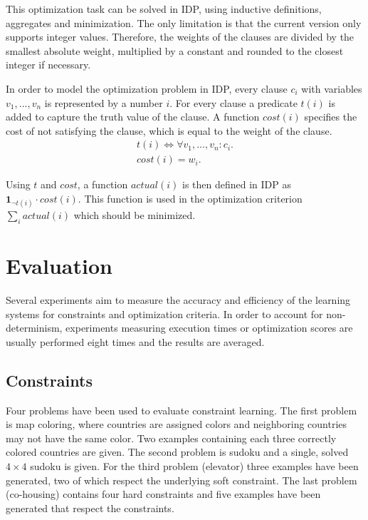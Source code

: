 \documentclass[letterpaper]{article}
\theoremstyle{definition}
\begin{document}
This optimization task can be solved in IDP, using inductive definitions, aggregates and minimization.
The only limitation is that the current version only supports integer values.
Therefore, the weights of the clauses are divided by the smallest absolute weight, multiplied by a constant and rounded to the closest integer if necessary.

In order to model the optimization problem in IDP, every clause $c_i$ with variables $v_1, ..., v_n$ is represented by a number $i$. For every clause a predicate $t(i)$ is added to capture the truth value of the clause.
A function $\mathit{cost}(i)$ specifies the cost of not satisfying the clause, which is equal to the weight of the clause.
\begin{eqnarray*}
  t(i) \Leftrightarrow \forall v_1, ..., v_n : c_i. \\
  cost(i) = w_i.
\end{eqnarray*}

Using $t$ and $\mathit{cost}$, a function $\mathit{actual}(i)$ is then defined in IDP as $\mathbf{1}_{\lnot t(i)} \cdot \mathit{cost}(i)$.
This function is used in the optimization criterion $\sum_i actual(i)$ which should be minimized. %


\section{Evaluation}
Several experiments aim to measure the accuracy and efficiency of the learning systems for constraints and optimization criteria.
In order to account for non-determinism, experiments measuring execution times or optimization scores are usually performed eight times and the results are averaged.

\subsection{Constraints}
Four problems have been used to evaluate constraint learning.
The first problem is map coloring, where countries are assigned colors and neighboring countries may not have the same color.
Two examples containing each three correctly colored countries are given.
The second problem is sudoku and a single, solved $4 \times 4$ sudoku is given.
For the third problem (elevator) three examples have been generated, two of which respect the underlying soft constraint.
The last problem (co-housing) contains four hard constraints and five examples have been generated that respect the constraints.
\end{document}
